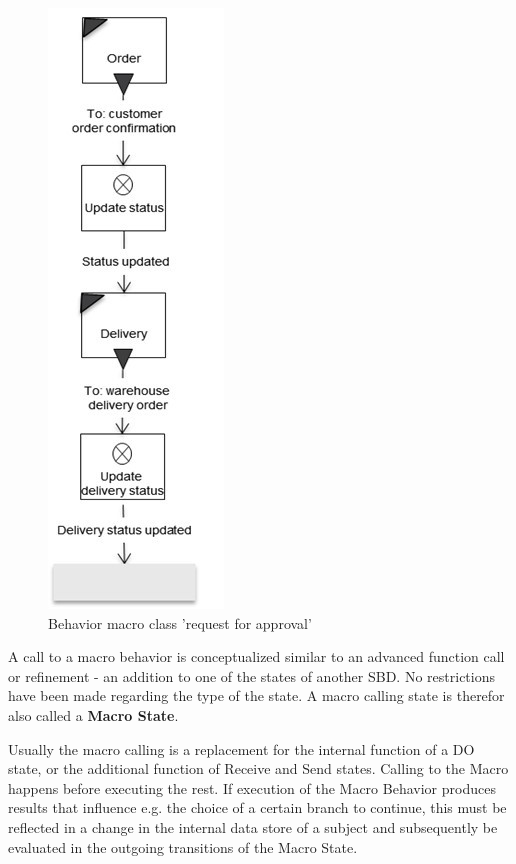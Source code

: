 \begin{figure}[htbp]
	\centering
	\includegraphics[width=0.2\linewidth]{Figures/Ontology/SubjectBehavior/MacroBehavior}
	\caption[Behavior macro class 'request for approval']{Behavior macro class 'request for approval'}
	\label{fig:macrobehavior}
\end{figure}


A call to a macro behavior is conceptualized similar to an advanced function call or refinement - an addition to one of the states of another SBD. No restrictions have been made regarding the type of the state. A macro calling state is therefor also called a \textbf{Macro State}.

Usually the macro calling is a replacement for the internal function of a DO state, or the additional function of Receive and Send states. Calling to the Macro happens before executing the rest. If execution of the Macro Behavior produces results that influence e.g. the choice of a certain branch to continue, this must be reflected in a change in the internal data store of a subject and subsequently be evaluated in the outgoing transitions of the Macro State. 



